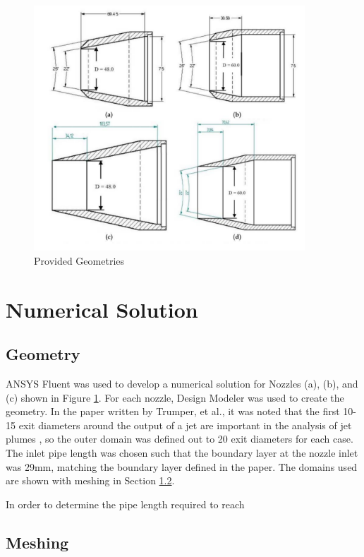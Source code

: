\documentclass[12pt]{article} %
\begin{document}
\begin{figure}
    \centering
    \includegraphics[width = 4in]{OG_Geometry.PNG}
    \caption{Provided Geometries}
    \label{fig:og_geometry}
\end{figure}

\section{Numerical Solution}
\subsection{Geometry}
ANSYS Fluent was used to develop a numerical solution for Nozzles (a), (b), and (c) shown in Figure \ref{fig:og_geometry}. For each nozzle, Design Modeler was used to create the geometry. In the paper written by Trumper, et al., it was noted that the first 10-15 exit diameters around the output of a jet are important in the analysis of jet plumes \cite{MilesT.Trumper2018IoNE}, so the outer domain was defined out to 20 exit diameters for each case. The inlet pipe length was chosen such that the boundary layer at the nozzle inlet was 29mm, matching the boundary layer defined in the paper. The domains used are shown with meshing in Section \ref{section:mesh}.\par

In order to determine the pipe length required to reach 

\subsection{Meshing}\label{section:mesh}
\end{document}
